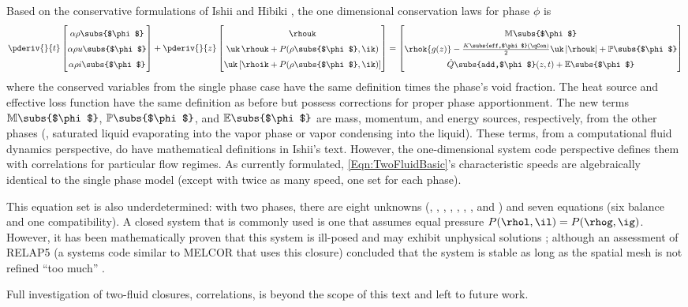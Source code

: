 Based on the conservative formulations of Ishii and Hibiki \cite{ishii_thermo-fluid_2011}, the one dimensional conservation laws for phase $\phi$ is 
\begin{equation}
    \renewcommand{\arraystretch}{1.5}
    \pderiv{}{t}
    \begin{bmatrix}
        \alpha\rho\subs{$\phi$} \\
        \alpha\rho{u}\subs{$\phi$} \\
        \alpha\rho{i}\subs{$\phi$}
    \end{bmatrix}
    + 
    \pderiv{}{z}\begin{bmatrix}
                    \rhouk                 \\
                    \uk\,    \rhouk  + P(\rho\subs{$\phi$},\ik)   \\
                    \uk\left[\rhoik  + P(\rho\subs{$\phi$},\ik)\right]
                \end{bmatrix}
             =  
    \begin{bmatrix}
        \mathbb{M}\subs{$\phi$} \\
        \rhok{g(z)} - \frac{K\subs{eff,$\phi$}(\qCon)}{2} \uk\,|\rhouk| + \mathbb{P}\subs{$\phi$}  \\
        \dot{Q}\subs{add,$\phi$}(z,t) + \mathbb{E}\subs{$\phi$}
    \end{bmatrix}
    \label{Eqn:TwoFluidBasic}
\end{equation}
where the conserved variables from the single phase case have the same definition times the phase's void fraction.
The heat source and effective loss function have the same definition as before but possess corrections for proper phase apportionment.
The new terms $\mathbb{M}\subs{$\phi$}$, $\mathbb{P}\subs{$\phi$} $, and $\mathbb{E}\subs{$\phi$}$ are mass, momentum, and energy sources, respectively, from the other phases (\ie, saturated liquid evaporating into the vapor phase or vapor condensing into the liquid).
These terms, from a computational fluid dynamics perspective, do have mathematical definitions in Ishii's text.
However, the one-dimensional system code perspective defines them with correlations for particular flow regimes.
As currently formulated, \cref{Eqn:TwoFluidBasic}'s characteristic speeds are algebraically identical to the single phase model (except with twice as many speed, one set for each phase).

This equation set is also underdetermined: with two phases, there are eight unknowns (\rhol, \rhog, \rhoul, \rhoug, \rhoil, \rhoig, \alphal, and \alphag) and seven equations (six balance and one compatibility).
A closed system that is commonly used is one that assumes equal pressure $P(\rhol,\il)=P(\rhog,\ig)$.
However, it has been mathematically proven that this system is ill-posed and may exhibit unphysical solutions \cite{dinh_understanding_2003}; although an assessment of RELAP5 (a systems code similar to MELCOR that uses this closure) concluded that the system is stable as long as the spatial mesh is not refined ``too much'' \cite{shieh_relap5/mod3_1994}.

Full investigation of two-fluid closures, correlations, \etc is beyond the scope of this text and left to future work.

